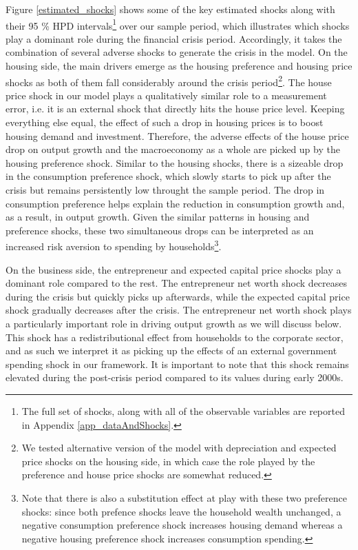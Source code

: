 \documentclass[12pt]{article}
\numberwithin{equation}{section}
\begin{document}
Figure \ref{estimated_shocks} shows some of the key estimated shocks along with their 95 \% HPD intervals\footnote{The full set of shocks, along with all of the observable variables are reported in Appendix \ref{app_dataAndShocks}. } over our sample period, which illustrates which shocks play a dominant role during the financial crisis period. Accordingly, it takes the combination of several adverse shocks to generate the crisis in the model. On the housing side, the main drivers emerge as the housing preference and housing price shocks as both of them fall considerably around the crisis period\footnote{We tested alternative version of the model with depreciation and expected price shocks on the housing side, in which case the role played by the preference and house price shocks are somewhat reduced.}. The house price shock in our model plays a qualitatively similar role to a measurement error, i.e. it is an external shock that directly hits the house price level. Keeping everything else equal, the effect of such a drop in housing prices is to boost housing demand and investment. Therefore, the adverse effects of the house price drop on output growth and the macroeconomy as a whole are picked up by the housing preference shock. Similar to the housing shocks, there is a sizeable drop in the consumption preference shock, which slowly starts to pick up after the crisis but remains persistently low throught the sample period. The drop in consumption preference helps explain the reduction in consumption growth and, as a result, in output growth. Given the similar patterns in housing and preference shocks, these two simultaneous drops can be interpreted as an increased risk aversion to spending by households\footnote{Note that there is also a substitution effect at play with these two preference shocks: since both prefence shocks leave the household wealth unchanged, a negative consumption preference shock increases housing demand whereas a negative housing preference shock increases consumption spending.}. 

On the business side, the entrepreneur and expected capital price shocks play a dominant role compared to the rest. The entrepreneur net worth shock decreases during the crisis but quickly picks up afterwards, while the expected capital price shock gradually decreases after the crisis. The entrepreneur net worth shock plays a particularly important role in driving output growth as we will discuss below. This shock has a redistributional effect from households to the corporate sector, and as such we interpret it as picking up the effects of an external government spending shock in our framework. It is important to note that this shock remains elevated during the post-crisis period compared to its values during early 2000s. 
\end{document}
